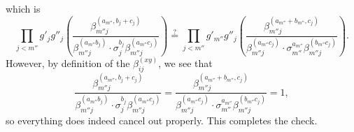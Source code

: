 which is
\[\prod_{j<m''}
g'_jg''_j\left(\frac{\beta_{m''j}^{(a_{m''},b_j+c_j)}}
{\beta_{m''j}^{(a_{m''}b_j)}\cdot
\sigma_j^{b_j}\beta_{m''j}^{(a_{m''}c_j)}}\right)
\stackrel?=\prod_{j<m''}
g'_{m''}g''_j\left(\frac{\beta_{m''j}^{(a_{m''}+b_{m''},c_j)}}
{\beta_{m''j}^{(a_{m''}c_j)}\cdot
\sigma_{m''}^{a_{m''}}\beta_{m''j}^{(b_{m''}c_j)}}\right).\]
However, by definition of the $\beta_{ij}^{(xy)}$, we see that
\[\frac{\beta_{m''j}^{(a_{m''},b_j+c_j)}}
{\beta_{m''j}^{(a_{m''}b_j)}\cdot
\sigma_j^{b_j}\beta_{m''j}^{(a_{m''}c_j)}}=\frac{\beta_{m''j}^{(a_{m''}+b_{m''},c_j)}}
{\beta_{m''j}^{(a_{m''}c_j)}\cdot
\sigma_{m''}^{a_{m''}}\beta_{m''j}^{(b_{m''}c_j)}}=1,\]
so everything does indeed cancel out properly. This completes the check.
